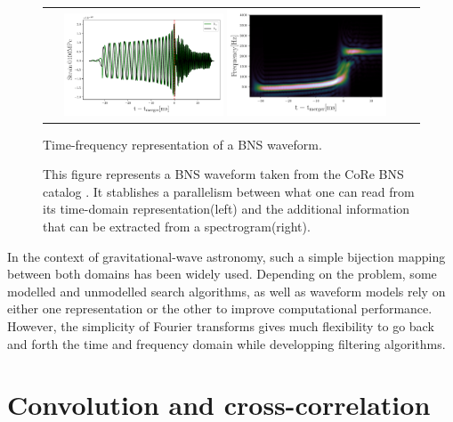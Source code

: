 \begin{figure}[hbt!]
\begin{center}
\begin{tabular}{cc}
\includegraphics[width=0.45\textwidth, angle=0]{images/Data_analysis/sig_proc/2_2L.pdf}

\includegraphics[width=0.45\textwidth, angle=0]{images/Data_analysis/sig_proc/2_2R.pdf}
\end{tabular}
\end{center}
\captionsetup{width=0.8\textwidth}
\caption{Time-frequency representation of a BNS waveform.}
\caption*{This figure represents a BNS waveform taken from the CoRe BNS catalog \cite{Dietrich:2018phi}. It stablishes a parallelism between what one can read from its time-domain representation(left) and the additional information that can be extracted from a spectrogram(right).}
\label{fig:2}
\end{figure}

\FloatBarrier

In the context of gravitational-wave astronomy, such a simple bijection mapping between both domains has been widely used. Depending on the problem, some modelled and unmodelled search algorithms, as well as waveform models rely on either one representation or the other to improve computational performance. However, the simplicity of Fourier transforms gives much flexibility to go back and forth the time and frequency domain while developping filtering algorithms. 


\section{Convolution and cross-correlation}

